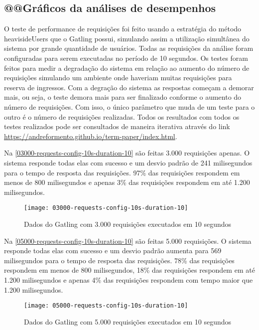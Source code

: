\subsection{@@Gráficos da análises de desempenhos}

O teste de performance de requisições foi feito usando a
estratégia do método heavisideUsers \cite{gatling-simulation-setup}
que o Gatling possui, simulando assim a utilização simultânea do sistema por
grande quantidade de usuários.
Todas as requisições da análise foram configuradas para serem executadas no período
de 10 segundos.
Os testes foram feitos para medir a degradação do sistema em relação ao aumento do
número de requisições simulando um ambiente onde haveriam muitas requisições para
reserva de ingressos.
Com a degração do sistema as respostas começam a demorar mais, ou seja,
o teste demora mais para ser finalizado conforme o aumento do número de requisições.
Com isso, o único parâmetro que muda de um teste para o outro
é o número de requisições realizadas.
Todos os resultados com todos os testes realizados pode ser consultados de maneira
iterativa através do link \url{https://andreformento.github.io/term-paper/index.html}.

Na \autoref{03000-requests-config-10s-duration-10} são feitas 3.000 requisições apenas.
O sistema responde todas elas com sucesso e um desvio padrão de 241 milisegundos
para o tempo de resposta das requisições.
97\% das requisições respondem em menos de 800 milisegundos e apenas 3\% das requisições
respondem em até 1.200 milisegundos.

\begin{figure}[h]
  \texttt{[image: 03000-requests-config-10s-duration-10]}
  \caption{Dados do Gatling com 3.000 requisições executados em 10 segundos}
  \label{03000-requests-config-10s-duration-10}
\end{figure}

Na \autoref{05000-requests-config-10s-duration-10} são feitas 5.000 requisições.
O sistema responde todas elas com sucesso e um desvio padrão aumenta para 569 milisegundos
para o tempo de resposta das requisições.
78\% das requisições respondem em menos de 800 milisegundos, 18\% das requisições
respondem em até 1.200 milisegundos e apenas 4\% das requisições
respondem com tempo maior que 1.200 milisegundos.

\begin{figure}[h]
  \texttt{[image: 05000-requests-config-10s-duration-10]}
  \caption{Dados do Gatling com 5.000 requisições executados em 10 segundos}
  \label{05000-requests-config-10s-duration-10}
\end{figure}

